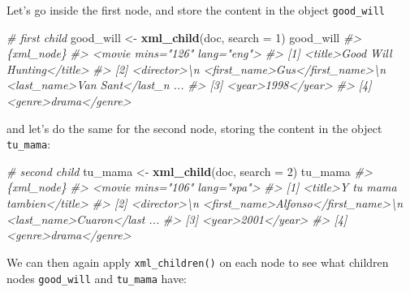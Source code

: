 \documentclass[
]{book}
\newenvironment{Shaded}{\begin{snugshade}}{\end{snugshade}}
\newcommand{\AttributeTok}[1]{\textcolor[rgb]{0.13,0.29,0.53}{#1}}
\newcommand{\CommentTok}[1]{\textcolor[rgb]{0.56,0.35,0.01}{\textit{#1}}}
\newcommand{\DecValTok}[1]{\textcolor[rgb]{0.00,0.00,0.81}{#1}}
\newcommand{\FunctionTok}[1]{\textcolor[rgb]{0.13,0.29,0.53}{\textbf{#1}}}
\newcommand{\NormalTok}[1]{#1}
\newcommand{\OtherTok}[1]{\textcolor[rgb]{0.56,0.35,0.01}{#1}}
\begin{document}
Let's go inside the first node, and store the content in the object
\texttt{good\_will}

\begin{Shaded}
\begin{Highlighting}[]
\CommentTok{\# first child}
\NormalTok{good\_will }\OtherTok{\textless{}{-}} \FunctionTok{xml\_child}\NormalTok{(doc, }\AttributeTok{search =} \DecValTok{1}\NormalTok{)}
\NormalTok{good\_will}
\CommentTok{\#\textgreater{} \{xml\_node\}}
\CommentTok{\#\textgreater{} \textless{}movie mins="126" lang="eng"\textgreater{}}
\CommentTok{\#\textgreater{} [1] \textless{}title\textgreater{}Good Will Hunting\textless{}/title\textgreater{}}
\CommentTok{\#\textgreater{} [2] \textless{}director\textgreater{}\textbackslash{}n  \textless{}first\_name\textgreater{}Gus\textless{}/first\_name\textgreater{}\textbackslash{}n  \textless{}last\_name\textgreater{}Van Sant\textless{}/last\_n ...}
\CommentTok{\#\textgreater{} [3] \textless{}year\textgreater{}1998\textless{}/year\textgreater{}}
\CommentTok{\#\textgreater{} [4] \textless{}genre\textgreater{}drama\textless{}/genre\textgreater{}}
\end{Highlighting}
\end{Shaded}

and let's do the same for the second node, storing the content in the object
\texttt{tu\_mama}:

\begin{Shaded}
\begin{Highlighting}[]
\CommentTok{\# second child}
\NormalTok{tu\_mama }\OtherTok{\textless{}{-}} \FunctionTok{xml\_child}\NormalTok{(doc, }\AttributeTok{search =} \DecValTok{2}\NormalTok{)}
\NormalTok{tu\_mama}
\CommentTok{\#\textgreater{} \{xml\_node\}}
\CommentTok{\#\textgreater{} \textless{}movie mins="106" lang="spa"\textgreater{}}
\CommentTok{\#\textgreater{} [1] \textless{}title\textgreater{}Y tu mama tambien\textless{}/title\textgreater{}}
\CommentTok{\#\textgreater{} [2] \textless{}director\textgreater{}\textbackslash{}n  \textless{}first\_name\textgreater{}Alfonso\textless{}/first\_name\textgreater{}\textbackslash{}n  \textless{}last\_name\textgreater{}Cuaron\textless{}/last ...}
\CommentTok{\#\textgreater{} [3] \textless{}year\textgreater{}2001\textless{}/year\textgreater{}}
\CommentTok{\#\textgreater{} [4] \textless{}genre\textgreater{}drama\textless{}/genre\textgreater{}}
\end{Highlighting}
\end{Shaded}

We can then again apply \texttt{xml\_children()} on each node to see what children
nodes \texttt{good\_will} and \texttt{tu\_mama} have:
\end{document}
